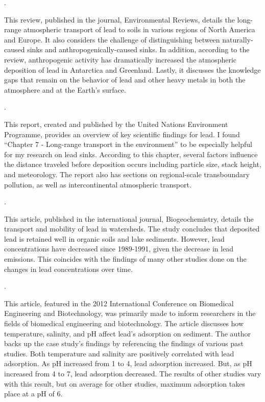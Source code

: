 \documentclass{article}
\begin{document}
\medskip

\noindent {}.

\medskip

This review, published in the journal, Environmental Reviews, details the long-range atmospheric transport of lead to soils in various regions of North America and Europe. It also considers the challenge of distinguishing between naturally-caused sinks and anthropogenically-caused sinks. In addition, according to the review, anthropogenic activity has dramatically increased the atmospheric deposition of lead in Antarctica and Greenland. Lastly, it discusses the knowledge gaps that remain on the behavior of lead and other heavy metals in both the atmosphere and at the Earth’s surface.

\medskip

\noindent {}.

\medskip

This report, created and published by the United Nations Environment Programme, provides an overview of key scientific findings for lead. I found ``Chapter 7 - Long-range transport in the environment''
 to be especially helpful for my research on lead sinks. According to this chapter, several factors influence the distance traveled before deposition occurs including particle size, stack height, and meteorology. The report also has sections on regional-scale transboundary pollution, as well as intercontinental atmospheric transport.

\medskip

\noindent {}.

\medskip

This article, published in the international journal, Biogeochemistry, details the transport and mobility of lead in watersheds. The study concludes that deposited lead is retained well in organic soils and lake sediments. However, lead concentrations have decreased since 1989-1991, given the decrease in lead emissions. This coincides with the findings of many other studies done on the changes in lead concentrations over time. 

\medskip

\noindent {}.

\medskip

This article, featured in the 2012 International Conference on Biomedical Engineering and Biotechnology, was primarily made to inform researchers in the fields of biomedical engineering and biotechnology. The article discusses how temperature, salinity, and pH affect lead’s adsorption on sediment. The author backs up the case study’s findings by referencing the findings of various past studies. Both temperature and salinity are positively correlated with lead adsorption. As pH increased from 1 to 4, lead adsorption increased. But, as pH increased from 4 to 7, lead adsorption decreased. The results of other studies vary with this result, but on average for other studies, maximum adsorption takes place at a pH of 6. 
\end{document}
